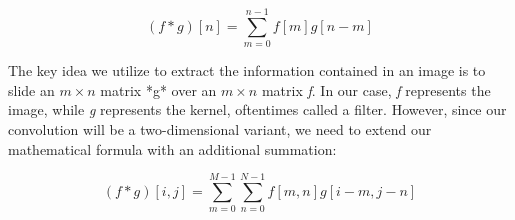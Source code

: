 \documentclass[onecolumn,10pt,cleanfoot]{asme2ej}
\begin{document}
\begin{equation}
(f \ast g)[n] = \sum_{m=0}^{n-1} f[m] g[n-m]
\end{equation}

The key idea we utilize to extract the information contained in an image is to slide an $m \times n$ matrix *g* over an $m \times n$ matrix \textit{f}. In our case, \textit{f} represents the image, while \textit{g} represents the kernel, oftentimes called a filter. However, since our convolution will be a two-dimensional variant, we need to extend our mathematical formula with an additional summation:

\begin{equation}
(f \ast g)[i, j] = \sum_{m=0}^{M-1} \sum_{n=0}^{N-1} f[m,n] g[i-m, j-n]
\end{equation}
\end{document}
